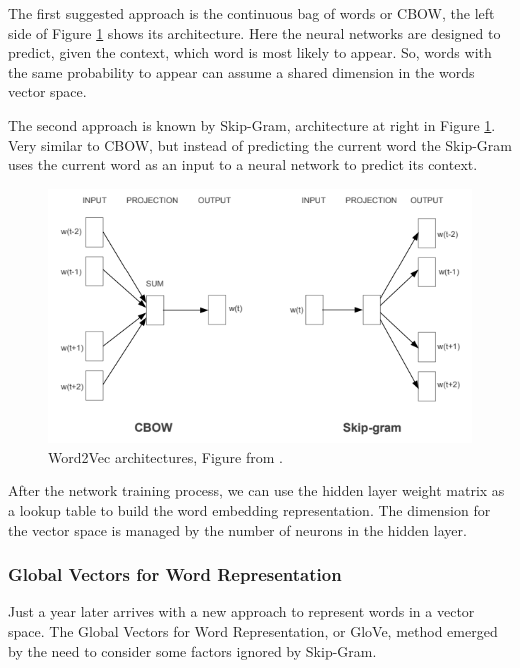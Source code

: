 	The first suggested approach is the continuous bag of words or CBOW, the left side of Figure \ref{fig:word2vecarchitectures} shows its architecture. Here the neural networks are designed to predict, given the context, which word is most likely to appear. So, words with the same probability to appear can assume a shared dimension in the words vector space. 

	The second approach is known by Skip-Gram, architecture at right in Figure \ref{fig:word2vecarchitectures}. Very similar to CBOW, but instead of predicting the current word the Skip-Gram uses the current word as an input to a neural network to predict its context.
	
	\begin{figure}[h!]
		\centering
		\includegraphics[width=0.85\linewidth]{01.Chapters/02.Background/word2vec_architectures}
		\caption{Word2Vec architectures, Figure from  \cite{mikolov2013efficient}.}
		\label{fig:word2vecarchitectures}
	\end{figure}
	
	
	After the network training process, we can use the hidden layer weight matrix as a lookup table to build the word embedding representation. The dimension for the vector space is managed by the number of neurons in the hidden layer. 		
	
	
	\subsubsection{Global Vectors for Word Representation} %
	
	Just a year later  arrives with a new approach to represent words in a vector space. The Global Vectors for Word Representation, or GloVe, method emerged by the need to consider some factors ignored by Skip-Gram.
		
